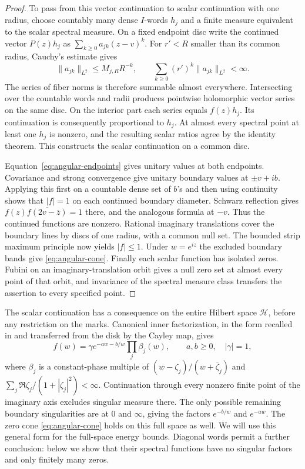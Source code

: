 \begin{proof}
To pass from this vector continuation to scalar continuation with one
radius, choose countably many dense $I$-words $h_j$ and a finite measure
equivalent to the scalar spectral measure.  On a fixed endpoint disc
write the continued vector $P(z)h_j$ as
$\sum_{k\ge0}a_{jk}(z-v)^k$.  For $r'<R$ smaller than its common
radius, Cauchy's estimate gives
\[
 \|a_{jk}\|_{L^2}\le M_{j,R}R^{-k},\qquad
 \sum_{k\ge0}(r')^k\|a_{jk}\|_{L^2}<\infty.
\]
The series of fiber norms is therefore summable almost everywhere.
Intersecting over the countable words and radii produces pointwise
holomorphic vector series on the same disc.  On the interior part each
series equals $f(z)h_j$.  Its continuation is consequently proportional
to $h_j$.  At almost every spectral point at least one $h_j$ is nonzero,
and the resulting scalar ratios agree by the identity theorem.  This
constructs the scalar continuation on a common disc.

Equation~\eqref{eq:angular-endpoints} gives unitary values at both
endpoints.  Covariance and strong convergence give unitary boundary
values at $\pm v+ib$.  Applying this first on a countable dense set of
$b$'s and then using continuity shows that $|f|=1$ on each continued
boundary diameter.  Schwarz reflection gives
$f(z)\overline{f(2v-\overline z)}=1$ there, and the analogous formula
at $-v$.  Thus the continued functions are nonzero.  Rational imaginary
translations cover the boundary lines by discs of one radius, with a
common null set.  The bounded strip maximum principle now yields
$|f|\le1$.  Under $w=e^{iz}$ the excluded boundary bands give
\eqref{eq:angular-cone}.  Finally each scalar function has isolated
zeros.  Fubini on an imaginary-translation orbit gives a null zero set
at almost every point of that orbit, and invariance of the spectral
measure class transfers the assertion to every specified point.
\end{proof}

The scalar continuation has a consequence on the entire Hilbert space
$\mathcal H$, before any restriction on the marks. Canonical inner
factorization, in the form recalled in
\cite[pp.~1367--1368, Equations~(1)--(3)]{AiDongJiang2019} and transferred
from the disk by the Cayley map, gives
\begin{equation}\label{eq:general-inner-factorization}
 f(w)=\gamma e^{-aw-b/w}\prod_j\beta_j(w),\qquad
 a,b\ge0,\quad |\gamma|=1,
\end{equation}
where $\beta_j$ is a constant-phase multiple of
$(w-\zeta_j)/(w+\overline\zeta_j)$ and
$\sum_j\Re\zeta_j/(1+|\zeta_j|^2)<\infty$.
Continuation through every nonzero finite point of the imaginary axis
excludes singular measure there. The only possible remaining boundary
singularities are at $0$ and $\infty$, giving the factors $e^{-b/w}$
and $e^{-aw}$. The zero cone \eqref{eq:angular-cone} holds on this
full space as well. We will use this general form for the full-space
energy bounds. Diagonal words permit a further conclusion: below we
show that their spectral functions have no singular factors and only
finitely many zeros.

